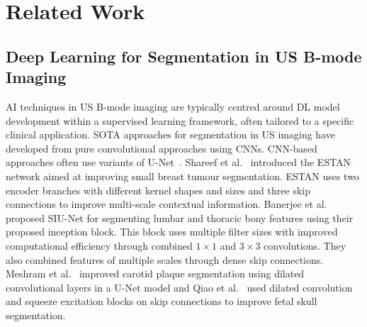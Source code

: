 \section{Related Work}
\subsection{Deep Learning for Segmentation in US B-mode Imaging}
AI techniques in US B-mode imaging are typically centred around DL model development within a supervised learning framework, often tailored to a specific clinical application. SOTA approaches for segmentation in US imaging have developed from pure convolutional approaches using CNNs. CNN-based approaches often use variants of U-Net~\cite{ronneberger_u-net_2015}. Shareef et al.~\cite{shareef_estan_2022} introduced the ESTAN network aimed at improving small breast tumour segmentation. ESTAN uses two encoder branches with different kernel shapes and sizes and three skip connections to improve multi-scale contextual information. Banerjee et al.~\cite{banerjee_ultrasound_2022} proposed SIU-Net for segmenting lumbar and thoracic bony features using their proposed inception block. This block uses multiple filter sizes with improved computational efficiency through combined $1\times1$ and $3\times3$ convolutions. They also combined features of multiple scales through dense skip connections. Meshram et al.~\cite{meshram_deep_2020} improved carotid plaque segmentation using dilated convolutional layers in a U-Net model and Qiao et al.~\cite{d_qiao_dilated_2020} used dilated convolution and squeeze excitation blocks on skip connections to improve fetal skull segmentation.

